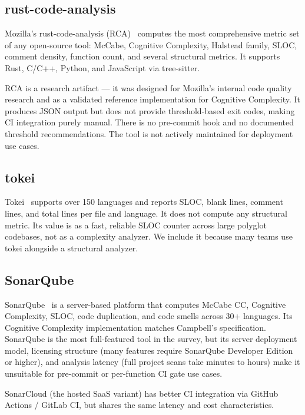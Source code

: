 \documentclass[10pt,twocolumn,letterpaper]{article}
\begin{document}
\subsection{rust-code-analysis}

Mozilla's rust-code-analysis (RCA)~\cite{rca} computes the most comprehensive
metric set of any open-source tool: McCabe, Cognitive Complexity, Halstead
family, SLOC, comment density, function count, and several structural metrics.
It supports Rust, C/C++, Python, and JavaScript via tree-sitter.

RCA is a research artifact --- it was designed for Mozilla's internal code
quality research and as a validated reference implementation for Cognitive
Complexity.  It produces JSON output but does not provide threshold-based
exit codes, making CI integration purely manual.  There is no pre-commit
hook and no documented threshold recommendations.  The tool is not actively
maintained for deployment use cases.

\subsection{tokei}

Tokei~\cite{tokei} supports over 150 languages and reports SLOC, blank
lines, comment lines, and total lines per file and language.  It does not
compute any structural metric.  Its value is as a fast, reliable SLOC
counter across large polyglot codebases, not as a complexity analyzer.
We include it because many teams use tokei alongside a structural analyzer.

\subsection{SonarQube}

SonarQube~\cite{sonarqube} is a server-based platform that computes
McCabe CC, Cognitive Complexity, SLOC, code duplication, and code smells
across 30+ languages.  Its Cognitive Complexity implementation matches
Campbell's specification.  SonarQube is the most full-featured tool in
the survey, but its server deployment model, licensing structure (many
features require SonarQube Developer Edition or higher), and analysis
latency (full project scans take minutes to hours) make it unsuitable for
pre-commit or per-function CI gate use cases.

SonarCloud (the hosted SaaS variant) has better CI integration via GitHub
Actions / GitLab CI, but shares the same latency and cost characteristics.
\end{document}
